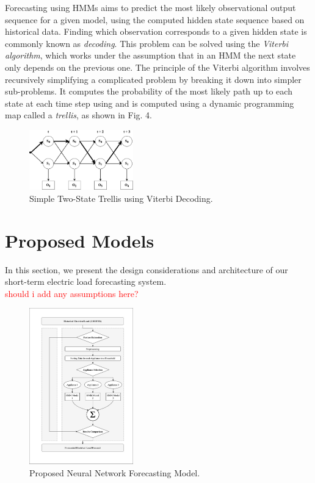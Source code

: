 \documentclass[conference]{IEEEtran}
\begin{document}
Forecasting using HMMs aims to predict the most likely observational output sequence for a given model, using the computed hidden state sequence based on historical data. Finding which observation corresponds to a given hidden state is commonly known as \textit{decoding}. This problem can be solved using the \textit{Viterbi algorithm}, which works under the assumption that in an HMM the next state only depends on the previous one. The principle of the Viterbi algorithm involves recursively simplifying a complicated problem by breaking it down into simpler sub-problems. It computes the probability of the most likely path up to each state at each time step using and is computed using a dynamic programming map called a \textit{trellis}, as shown in Fig. 4.

\begin{figure}[htbp]
  \centering
  \includegraphics[width=0.4\textwidth]{Trellis.eps}
  \caption{Simple Two-State Trellis using Viterbi Decoding.}
  \label{fig:trellis}
\end{figure}

\section{Proposed Models}
In this section, we present the design considerations and architecture of our short-term electric load forecasting system.
\\
\textcolor{red}{should i add any assumptions here?}

\begin{figure}[htbp]
  \centering
  \includegraphics[width=0.4\textwidth]{HMM_Model.eps}
  \caption{Proposed Neural Network Forecasting Model.}
  \label{fig:hmm_model}
\end{figure}
\end{document}
